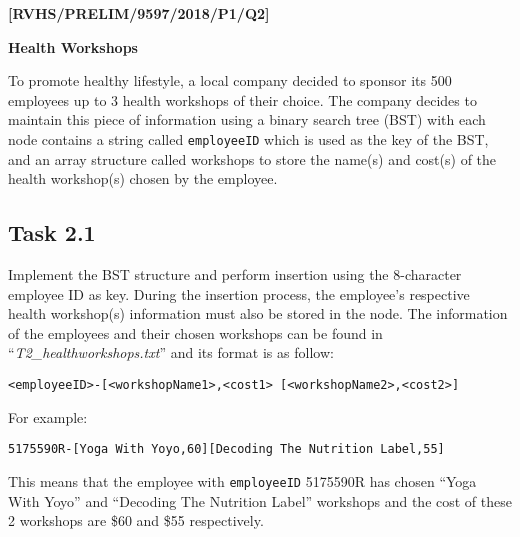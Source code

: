 \item \textbf{{[}RVHS/PRELIM/9597/2018/P1/Q2{]} }

\textbf{Health Workshops }

To promote healthy lifestyle, a local company decided to sponsor its
500 employees up to 3 health workshops of their choice. The company
decides to maintain this piece of information using a binary search
tree (BST) with each node contains a string called \texttt{employeeID}
which is used as the key of the BST, and an array structure called
workshops to store the name(s) and cost(s) of the health workshop(s)
chosen by the employee. 

\subsection*{Task 2.1}

Implement the BST structure and perform insertion using the 8-character
employee ID as key. During the insertion process, the employee\textquoteright s
respective health workshop(s) information must also be stored in the
node. The information of the employees and their chosen workshops
can be found in \textquotedblleft \emph{T2\_healthworkshops.txt}\textquotedblright{}
and its format is as follow: 

\texttt{<employeeID>-{[}<workshopName1>,<cost1> {[}<workshopName2>,<cost2>{]} }

For example: 

\texttt{5175590R-{[}Yoga With Yoyo,60{]}{[}Decoding The Nutrition
Label,55{]} }

This means that the employee with \texttt{employeeID} 5175590R has
chosen \textquotedblleft Yoga With Yoyo\textquotedblright{} and \textquotedblleft Decoding
The Nutrition Label\textquotedblright{} workshops and the cost of
these 2 workshops are \$60 and \$55 respectively. 

